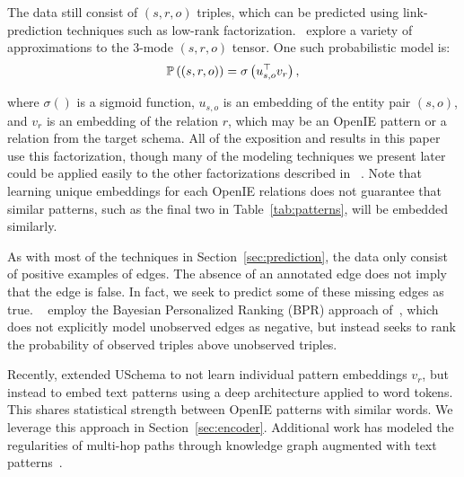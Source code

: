 The data still consist of $(s,r,o)$ triples, which can be predicted using link-prediction techniques such as low-rank factorization.~\citet{limin} explore a variety of approximations to the 3-mode $(s,r,o)$ tensor. One such probabilistic model is:
\vspace{-.1cm}
\begin{equation}
\mathbb{P} \left((s,r,o)\right) = \sigma\left( u_{s,o}^\top v_r \right), \label{eq:US-prob}
\end{equation}
\vspace{-.5cm}

where  $\sigma()$ is a sigmoid function, $u_{s,o}$ is an embedding of the entity pair $(s,o)$, and $v_r$ is an embedding of the relation $r$, which may be an OpenIE pattern or a relation from the target schema. All of the exposition and results in this paper use this factorization, though many of the modeling techniques we present later could be applied easily to the other factorizations described in ~\citet{limin}. Note that learning unique embeddings for each OpenIE relations does not guarantee that similar patterns, such as the final two in Table~\ref{tab:patterns}, will be embedded similarly.

As with most of the techniques in Section~\ref{sec:prediction}, the data only consist of positive examples of edges. The absence of an annotated edge does not imply that the edge is false. In fact, we seek to predict some of these missing edges as true. ~\citet{limin} employ the Bayesian Personalized Ranking (BPR) approach of~\citet{rendle2009bpr}, which does not explicitly model unobserved edges as negative, but instead seeks to rank the probability of observed triples above unobserved triples.


Recently, \citet{toutanova2015representing} extended USchema to not learn individual pattern embeddings $v_r$, but instead to embed text patterns using a deep architecture applied to word tokens. This shares statistical strength between OpenIE patterns with similar words. We leverage this approach in Section~\ref{sec:encoder}. Additional work has modeled the regularities of multi-hop paths through knowledge graph augmented with text patterns~\citep{pra,pra_second,vector_pra,neelakantan2015compositional}.



